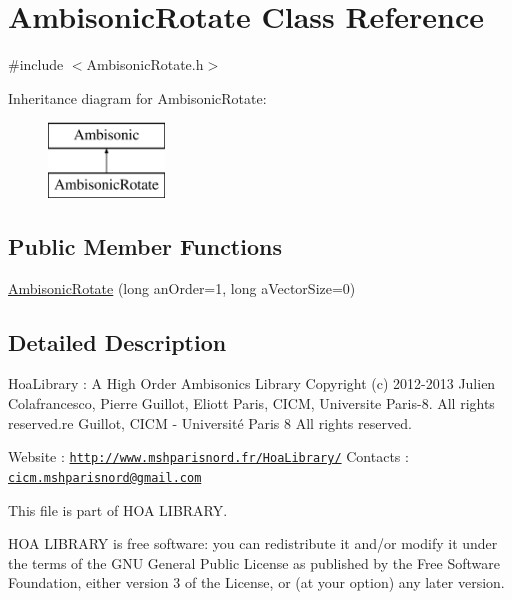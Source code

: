 \hypertarget{class_ambisonic_rotate}{\section{Ambisonic\-Rotate Class Reference}
\label{class_ambisonic_rotate}
}


{\ttfamily \#include $<$Ambisonic\-Rotate.\-h$>$}

Inheritance diagram for Ambisonic\-Rotate\-:\begin{figure}[H]
\begin{center}
\leavevmode
\includegraphics[height=2.000000cm]{class_ambisonic_rotate}
\end{center}
\end{figure}
\subsection*{Public Member Functions}
\begin{DoxyCompactItemize}
\item 
\hyperlink{class_ambisonic_rotate_a27eb54b220b09d45541fb573f295064d}{Ambisonic\-Rotate} (long an\-Order=1, long a\-Vector\-Size=0)
\end{DoxyCompactItemize}


\subsection{Detailed Description}
Hoa\-Library \-: A High Order Ambisonics Library Copyright (c) 2012-\/2013 Julien Colafrancesco, Pierre Guillot, Eliott Paris, C\-I\-C\-M, Universite Paris-\/8. All rights reserved.\-re Guillot, C\-I\-C\-M -\/ Université Paris 8 All rights reserved.

Website \-: \href{http://www.mshparisnord.fr/HoaLibrary/}{\tt http\-://www.\-mshparisnord.\-fr/\-Hoa\-Library/} Contacts \-: \href{mailto:cicm.mshparisnord@gmail.com}{\tt cicm.\-mshparisnord@gmail.\-com}

This file is part of H\-O\-A L\-I\-B\-R\-A\-R\-Y.

H\-O\-A L\-I\-B\-R\-A\-R\-Y is free software\-: you can redistribute it and/or modify it under the terms of the G\-N\-U General Public License as published by the Free Software Foundation, either version 3 of the License, or (at your option) any later version.

